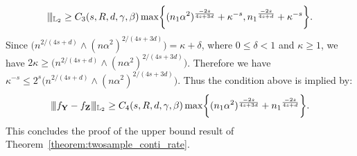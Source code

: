 \documentclass[twoside,11pt]{article}
\newcommand{\Ell}{\mathbb{L}}
\newcommand{\EllTwo}{\Ell_2} %
\newcommand{\vectorize}[1]{\mathbf{#1}}
\newcommand{\dimDensity}{d} %
\newcommand{\sampleSize}{n}
\newcommand{\smoothness}{s}
\newcommand{\ballRadius}{R}
\newcommand{\privacyParameter}{\alpha} %
\newcommand{\maxErrorTypeTwo}{\beta} %
\newcommand{\maxErrorTypeOne}{\gamma} %
\newcommand{\binNum}{\kappa}           %
\begin{document}
\begin{appendix}
\begin{equation*}
		\vert\kern-0.25ex
		\vert\kern-0.25ex
		\vert_{\EllTwo}
		\geq
		C_3 (\smoothness, \ballRadius, \dimDensity, \maxErrorTypeOne, \maxErrorTypeTwo)
		\max
		\biggl\{
		(\sampleSize_1 \privacyParameter^2)^{\frac{-2\smoothness}{4\smoothness+3\dimDensity}}
		+
		\binNum^{-\smoothness}
		,
		{\sampleSize_1}^{
			\frac
			{-2\smoothness}
			{4\smoothness+\dimDensity}
		}+
		\binNum^{-\smoothness}
		\biggr\}.
	\end{equation*}
	Since $\bigl( n^{2/(4\smoothness+\dimDensity)}\wedge (n \privacyParameter^2)^{2/(4\smoothness+3\dimDensity)} \bigr) = \binNum + \delta$, where $0 \leq \delta < 1$ and $\binNum \geq 1$, we have $2 \binNum \geq \bigl( n^{2/(4\smoothness+\dimDensity)}\wedge (n \privacyParameter^2)^{2/(4\smoothness+3\dimDensity)} \bigr)$.
	Therefore we have $\binNum^{-\smoothness} \leq 2^\smoothness \bigl( n^{2/(4\smoothness+\dimDensity)}\wedge (n \privacyParameter^2)^{2/(4\smoothness+3\dimDensity)} \bigr)$. Thus the condition above is implied by:
	\begin{equation*}
		\vert\kern-0.25ex
		\vert\kern-0.25ex
		\vert
		f_{\vectorize{Y}} - f_{\vectorize{Z}}
		\vert\kern-0.25ex
		\vert\kern-0.25ex
		\vert_{\EllTwo}
		\geq
		C_4 (\smoothness, \ballRadius, \dimDensity, \maxErrorTypeOne, \maxErrorTypeTwo)
		\max
		\biggl\{
		(\sampleSize_1 \privacyParameter^2)^{\frac{-2\smoothness}{4\smoothness+3\dimDensity}}
		+
		{\sampleSize_1}^{
			\frac
			{-2\smoothness}
			{4\smoothness+\dimDensity}
		}
		\biggr\}.
	\end{equation*}
	This concludes the proof of the upper bound result of Theorem~\ref{theorem:twosample_conti_rate}.

\end{appendix}
\end{document}
